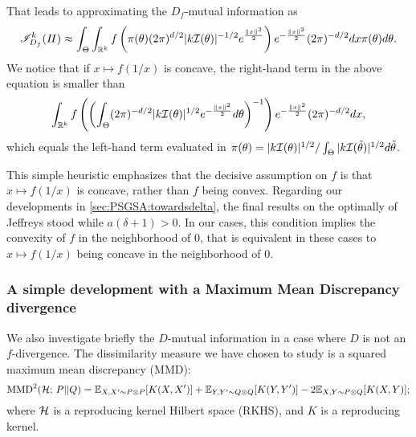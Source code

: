         That leads to approximating the $D_f$-mutual information  as 
            \begin{equation}
                \mathscr{I}_{D_f}^k(\varPi) \approx \int_\Theta\int_{\mathbb{R}^k} f\left(\pi(\theta)(2\pi)^{d/2}|k\mathcal{I}(\theta)|^{-1/2}e^{\frac{\|x\|^2}{2}}\right) e^{-\frac{\|x\|^2}{2}} (2\pi)^{-d/2}dx\pi(\theta)d\theta.
            \end{equation}
        We notice that if $x\mapsto f(1/x)$ is concave, the right-hand term in the above equation is smaller than 
            \begin{equation}
                 \int_{\mathbb{R}^k}f\left(\left(\int_\Theta (2\pi)^{-d/2}|k\mathcal{I}(\theta)|^{1/2} e^{-\frac{\|x\|^2}{2}}d\theta\right)^{-1}\right)e^{-\frac{\|x\|^2}{2}}(2\pi)^{-d/2}dx ,
            \end{equation}
        which equals the left-hand term evaluated in $\pi(\theta) = |k\mathcal{I}(\theta)|^{1/2} / \int_\Theta|k\mathcal{I}(\tilde\theta)|^{1/2} d\tilde\theta$.

        This simple heuristic emphasizes that the decisive assumption on $f$ is that $x\mapsto f(1/x)$ is concave, rather than $f$ being convex.
        Regarding our developments in  \cref{sec:PSGSA:towardsdelta}, the final results on the optimally of Jeffreys stood while $a(\delta+1)>0$.
        In our cases, this condition implies the convexity of $f$ in the neighborhood of $0$, that is equivalent in these cases to $x\mapsto f(1/x)$ being concave in the neighborhood of $0$.
        



        
        \subsubsection{A simple development with a Maximum Mean Discrepancy divergence}


        We also investigate briefly the $D$-mutual information in a case where $D$ is not an $f$-divergence. The dissimilarity measure we have chosen to study is a squared maximum mean discrepancy (MMD):
                \begin{equation}
                    \text{MMD}^2(\mathcal{H};\,P||Q) = \mathbb{E}_{X,X'\sim P\otimes P}[K(X,X')] + \mathbb{E}_{Y,Y'\sim Q\otimes Q}[K(Y,Y')] - 2\mathbb{E}_{X,Y\sim P\otimes Q}[K(X,Y)];
                \end{equation}
        where $\mathcal{H}$ is a reproducing kernel Hilbert space (RKHS), and $K$ is a reproducing kernel.

